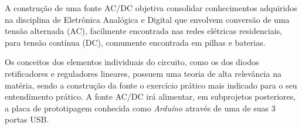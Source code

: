 A construção de uma fonte AC/DC objetiva consolidar conhecimentos adquiridos na disciplina de Eletrônica Analógica e Digital que envolvem conversão de uma tensão alternada (AC), facilmente encontrada nas redes elétricas residenciais, para tensão contínua (DC), comumente encontrada em pilhas e baterias.
\par
Os conceitos dos elementos individuais do circuito, como os dos diodos retificadores e reguladores lineares, possuem uma teoria de alta relevância na matéria, sendo a construção da fonte o exercício prático mais indicado para o seu entendimento prático. A fonte AC/DC irá alimentar, em subprojetos posteriores, a placa de prototipagem conhecida como \textit{Arduíno} através de uma de suas 3 portas USB.